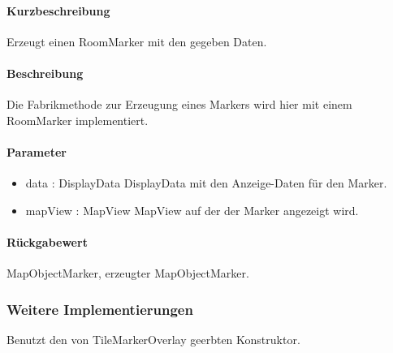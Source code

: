 \paragraph*{Kurzbeschreibung}
Erzeugt einen RoomMarker mit den gegeben Daten.
\paragraph*{Beschreibung}
Die Fabrikmethode zur Erzeugung eines Markers wird hier mit einem RoomMarker implementiert.
\paragraph*{Parameter}
\begin{itemize}
    \item data : DisplayData DisplayData mit den Anzeige-Daten für den Marker.
    \item mapView : MapView MapView auf der der Marker angezeigt wird.
\end{itemize}
\paragraph*{Rückgabewert}
MapObjectMarker, erzeugter MapObjectMarker.

\subsubsection{Weitere Implementierungen}%
Benutzt den von TileMarkerOverlay geerbten Konstruktor.